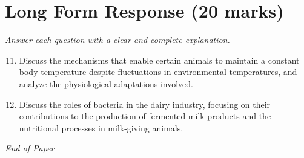 \documentclass[12pt]{article}
\begin{document}
\section*{Long Form Response (20 marks)}
\textit{Answer each question with a clear and complete explanation.}
\begin{enumerate}[label=\arabic*.]
\setcounter{enumi}{10}
\item Discuss the mechanisms that enable certain animals to maintain a constant body temperature despite fluctuations in environmental temperatures, and analyze the physiological adaptations involved.
\item Discuss the roles of bacteria in the dairy industry, focusing on their contributions to the production of fermented milk products and the nutritional processes in milk-giving animals.
\end{enumerate}

\vfill
\noindent\textit{End of Paper}
\end{document}
